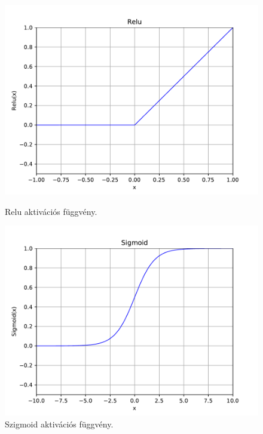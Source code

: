 \begin{itemize}
\begin{figure} [h!]
		\begin{minipage}[c]{0.33\linewidth}
			\centering
			\includegraphics[width=\textwidth]{img/relu.pdf}
					\captionsetup{justification=centering}
			\caption{Relu aktivációs függvény.}
			\label{fig:relu}
			
		\end{minipage}\hfill
		\begin{minipage}[c]{0.33\linewidth}
			\centering
			\includegraphics[width=\textwidth]{img/sigmoid.pdf}
					\captionsetup{justification=centering}
			\caption{Szigmoid aktivációs függvény.}
			\label{fig:sigmoid}
			
		\end{minipage}\hfill
		\begin{minipage}[c]{0.33\linewidth}
			

\end{minipage}
\end{figure}
\end{itemize}
